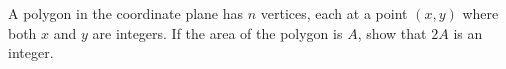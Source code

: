 A polygon in the coordinate plane has $n$ vertices, each at a point $(x,y)$ where both $x$ and $y$ are integers. If the area of the polygon is $A$, show that $2A$ is an integer.
